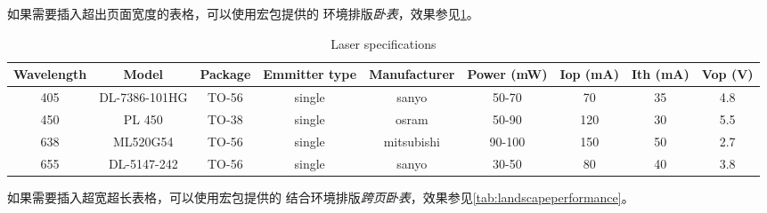 如果需要插入超出页面宽度的表格，可以使用宏包提供的 
环境排版\emph{卧表}，效果参见\ref{tab:toowidetab}。

\begin{landscape}
\vspace*{\fill} %
\begin{table}[!htb]
  \centering
  \caption{Laser specifications}
  \label{tab:toowidetab}
  \begin{tabular}{ccccccccc}
    \toprule
    Wavelength & Model & Package & Emmitter type & Manufacturer & Power (mW) & Iop (mA) & Ith (mA) & Vop (V)\\
    \midrule
    405 & DL-7386-101HG & TO-56 & single & sanyo & 50-70 & 70 & 35 & 4.8\\
    450 & PL 450 & TO-38 & single & osram & 50-90 & 120 & 30 & 5.5\\
    638 & ML520G54 & TO-56 & single & mitsubishi & 90-100 & 150 & 50 & 2.7\\
    655 &  DL-5147-242 & TO-56 & single & sanyo & 30-50 & 80 & 40 & 3.8\\
    \bottomrule
  \end{tabular}
\end{table}
\vspace*{\fill} %
\end{landscape}

如果需要插入超宽超长表格，可以使用宏包提供的 
结合环境排版\emph{跨页卧表}，效果参见\ref{tab:landscapeperformance}。

